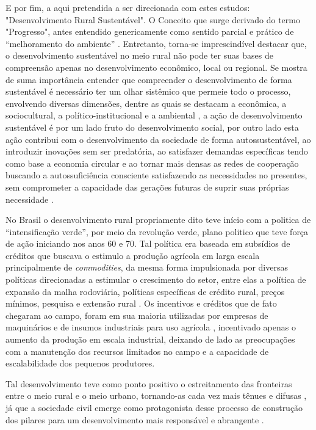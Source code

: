 E por fim, a aqui pretendida a ser direcionada com estes estudos: "Desenvolvimento Rural Sustentável". O Conceito que surge derivado do termo "Progresso", antes entendido genericamente como sentido parcial e prático de “melhoramento do ambiente” \cite{almeida_da_1995}. Entretanto, torna-se imprescindível destacar que, o desenvolvimento sustentável no meio rural não pode ter suas bases de compreensão apenas no desenvolvimento econômico, local ou regional. Se mostra de suma importância entender que compreender o desenvolvimento de forma sustentável é necessário ter um olhar sistêmico que permeie todo o processo, envolvendo diversas dimensões, dentre as quais se destacam a econômica, a sociocultural, a político-institucional e a ambiental \cite{vieira_politica_2015}, a ação de desenvolvimento sustentável é por um lado fruto do desenvolvimento social, por outro lado esta ação contribui com o desenvolvimento da sociedade de forma autossustentável, ao introduzir inovações sem ser predatória, ao satisfazer demandas específicas tendo como base a economia circular e ao tornar mais densas as redes de cooperação buscando a autossuficiência consciente  satisfazendo as necessidades no presentes, sem comprometer a capacidade das gerações futuras de suprir suas próprias necessidade \cite{onu_sustainable_2016}.

No Brasil o desenvolvimento rural propriamente dito teve início com a politica de “intensificação verde”, por meio da revolução verde, plano politico que teve força de ação iniciando nos anos 60 e 70. Tal política era baseada em subsídios de créditos que buscava o estimulo a produção agrícola em larga escala principalmente de \textit{commodities}, da mesma forma impulsionada por diversas políticas direcionadas a estimular o crescimento do setor, entre elas a política de expansão da malha rodoviária, políticas específicas de crédito rural, preços mínimos, pesquisa e extensão rural \cite{kageyama_o_1990}. Os incentivos e créditos que de fato chegaram ao campo, foram em sua maioria utilizadas por empresas de maquinários e de insumos industriais para uso agrícola \cite{strassburg_producao_2015}, incentivado apenas o aumento da produção em escala industrial, deixando de lado as preocupações com a manutenção dos recursos limitados no campo e a capacidade de escalabilidade dos pequenos produtores.

Tal desenvolvimento teve como ponto positivo o estreitamento das fronteiras entre o meio rural e o meio urbano, tornando-as cada vez mais tênues e difusas \cite{freitas_mudancas_2012}, já que a sociedade civil emerge como protagonista desse processo de construção dos pilares para um desenvolvimento mais responsável e abrangente \cite{de_souza_empreendedorismo_2016}. 

